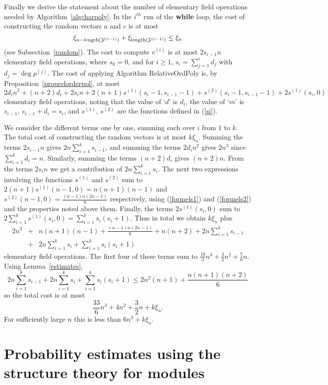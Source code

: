 Finally we derive the statement about the number of elementary field operations
needed by Algorithm~\ref{algcharpoly}.
In the $i^{th}$ run of the {\bf while} loop, the cost of constructing the
random vectors $a$ and $c$ is at most 
\[ \xi_{n-\mathrm{length}(\mathcal{Y}^{(i-1)})}+\xi_{\mathrm{length}(\mathcal{Y}^{(i-1)})}
\leq \xi_{n} 
\]
(see Subsection~\ref{random}). The cost to compute $v^{(i)}$ is 
at most $2s_{i-1}n$ elementary field operations,
where $s_0=0$, and for $i\geq1$, $s_{i}=\sum_{j=1}^{i}d_j$ with 
$d_j=\deg p^{(j)}$. The cost 
of applying Algorithm {\sc RelativeOrdPoly}
is, by Proposition~\ref{proprelorderpol}, at most
\[ 
2d_in^2 + (n+2)d_i +2s_{i}n + 2(n+1)s^{(1)}(s_i-1,s_{i-1}-1) 
+ s^{(2)}(s_i-1,s_{i-1}-1) + 2s^{(1)}(s_i,0) 
\]
elementary field operations, noting that the value 
of `$d$' is $d_i$, the value of `$m$' is $s_{i-1}$, $s_{i-1}+d_i=s_i$,
and $s^{(1)}$, $s^{(2)}$ are the functions defined in (\ref{si}).

We consider the different terms
one by one, summing each over $i$ from $1$ to $k$. 
The total cost of constructing the random vectors is at most $k\xi_{n}$.
Summing the terms $2 s_{i-1} n$ gives $2n\sum_{i=1}^{k} s_{i-1}$, and
summing the terms $2d_in^2$ gives $2n^3$ since $\sum_{i=1}^k d_i=n$. 
Similarly, summing the terms
$(n+2)d_i$ gives $(n+2)n$. From the terms $2s_in$ we
get a contribution of 
$2n \sum_{i=1}^{k} s_i$.
The next two expressions involving the functions $s^{(1)}$ and $s^{(2)}$
sum to $2(n+1)s^{(1)}(n-1,0) = n(n+1)(n-1)$ and $s^{(2)}(n-1,0) = 
\frac{(n-1)n(2n-1)}{6}$ respectively, using (\ref{formels1}) and
(\ref{formels2}) and the properties noted
above them. 
Finally, the terms $2s^{(1)}(s_i,0)$ sum to 
$2\sum_{i=1}^k s^{(1)}(s_i,0) 
= \sum_{i=1}^k s_i(s_i+1)$.
Thus in total we obtain $k\xi_n$ plus
\begin{eqnarray*}
 2n^3
   &+&n(n+1)(n-1)
   +\frac{(n-1)n(2n-1)}{6}
   +n(n+2)
   +2n\sum_{i=1}^k s_{i-1} \\
   &+&2n\sum_{i=1}^k s_i
   +\sum_{i=1}^k s_i(s_i+1) 
\end{eqnarray*}
elementary field operations. The first four of these terms sum to $\frac{10}{3}n^3
   +\frac{3}{2}n^2
   +\frac{7}{6}n$. 
Using Lemma~\ref{estimates},
\[ 
   2n\sum_{i=1}^k s_{i-1}
   +2n\sum_{i=1}^k s_i
   +\sum_{i=1}^k s_i(s_i+1)\leq 2n^2(n+1)+\frac{n(n+1)(n+2)}{6} \]
so the total cost is at most 
\[
\frac{33}{6}n^3+4n^2+\frac{3}{2}n +k\xi_n.
\]
For sufficiently large $n$ this is less than $6n^3+k\xi_n$.
\proofend


\section{Probability estimates using the structure theory for modules}
\label{probest}

